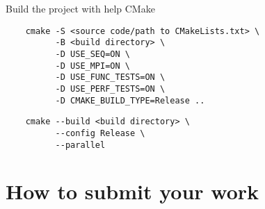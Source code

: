 \documentclass{beamer}
\begin{document}
\begin{frame}[fragile]{Build the project with help CMake}

  \lstset{style=CStyle, caption=Configure the build}
  \begin{lstlisting}
    cmake -S <source code/path to CMakeLists.txt> \
          -B <build directory> \
          -D USE_SEQ=ON \
          -D USE_MPI=ON \ 
          -D USE_FUNC_TESTS=ON \
          -D USE_PERF_TESTS=ON \
          -D CMAKE_BUILD_TYPE=Release ..
  \end{lstlisting}

  \lstset{style=CStyle, caption=Build the project}
  \begin{lstlisting}
    cmake --build <build directory> \
          --config Release \
          --parallel
  \end{lstlisting}

\end{frame}

\section{How to submit your work}
\end{document}
